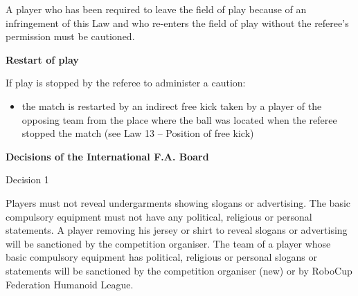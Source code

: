 \bigskip

A player who has been required to leave the field of play because of an infringement of this Law and who re-enters the field of play without the referee's permission must be cautioned.

\bigskip

{\bfseries Restart of play}

\headlinebox

If play is stopped by the referee to administer a caution:

\begin{itemize}
\item the match is restarted by an indirect free kick taken by a player of the opposing team from the place where the ball was located when the referee stopped the match (see Law 13 -- Position of free kick)
\end{itemize}

\bigskip

\clearpage
{\bfseries Decisions of the International F.A. Board }

\headlinebox

Decision 1

Players must not reveal undergarments showing slogans or advertising. The basic compulsory equipment must not have any political, religious or personal statements. A player removing his jersey or shirt to reveal slogans or advertising will be sanctioned by the competition organiser. The team of a player whose basic compulsory equipment has political, religious or personal slogans or statements will be sanctioned by the competition organiser (new) or by RoboCup Federation Humanoid League.
